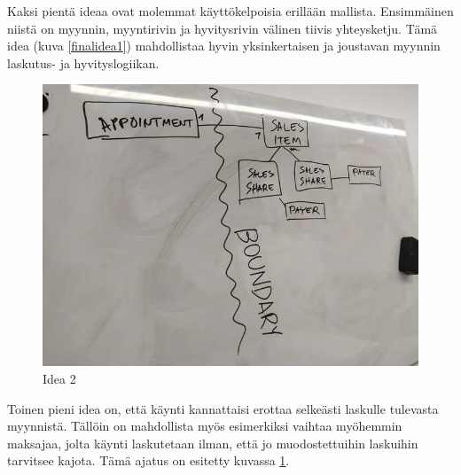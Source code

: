 Kaksi pientä ideaa ovat molemmat käyttökelpoisia erillään mallista.
Ensimmäinen niistä on myynnin, myyntirivin ja hyvitysrivin välinen
tiivis yhteysketju. Tämä idea (kuva \ref{finalidea1}) mahdollistaa hyvin
yksinkertaisen ja joustavan myynnin laskutus- ja hyvityslogiikan.

\begin{figure}
\centering
\includegraphics{illustration/final-idea-2.jpg}
\caption{\label{finalidea2}Idea 2}
\end{figure}

Toinen pieni idea on, että käynti kannattaisi erottaa selkeästi laskulle
tulevasta myynnistä. Tällöin on mahdollista myös esimerkiksi vaihtaa
myöhemmin maksajaa, jolta käynti laskutetaan ilman, että jo
muodostettuihin laskuihin tarvitsee kajota. Tämä ajatus on esitetty
kuvassa \ref{finalidea2}.
